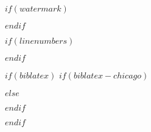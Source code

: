 
\usepackage{etoolbox}


$if(watermark)$
  \usepackage[color={[gray]{0.97}}]{draftwatermark}
$endif$

$if(linenumbers)$
  \usepackage[left, displaymath, mathlines]{lineno}
  \linenumbers
$endif$

$if(biblatex)$
  $if(biblatex-chicago)$
    \usepackage[
      $if(biblio-style)$$biblio-style$,$endif$
      $for(biblatexoptions)$$biblatexoptions$$sep$,$endfor$
    ]{biblatex-chicago}
  $else$
    \usepackage[
      $if(biblio-style)$style=$biblio-style$,$endif$
      $for(biblatexoptions)$$biblatexoptions$$sep$,$endfor$
    ]{biblatex}
  $endif$

  \setlength\bibitemsep{6pt}
  \setlength\bibhang{\parindent} %
  
  
  
  
  \pretocmd{\printbibliography}{\clearpage\singlespace}{}{}
  
  \AtBeginBibliography{\vspace*{10pt}} %
$endif$



\providecommand{\keywords}[1]{\noindent\textbf{Keywords: }#1}

\providecommand{\targets}[1]{\noindent\textbf{Target Journal(s): }#1}

\providecommand{\correspond}[1]{
  \noindent Corresponding author email: \textit{#1}
}

\usepackage{authblk}
\renewcommand*{\Authsep}{, }
\renewcommand*{\Authand}{ and }
\renewcommand*{\Authands}{, and }
\renewcommand\Affilfont{\small\itshape}
\renewcommand\Authfont{\fontsize{12}{14.4}\selectfont}

